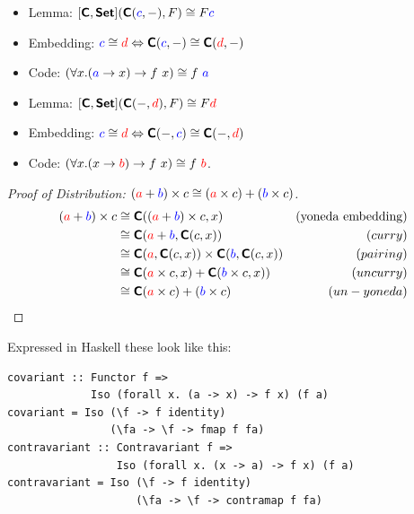 \documentclass[tikz]{beamer}
\newcommand{\cat}[1]{\bm{ \mathsf{#1} }}
\newcommand{\cc}{\cat{C}}
\newcommand{\red}[1]{\textcolor{red}{#1}}
\newcommand{\blue}[1]{\textcolor{blue}{#1}}
\theoremstyle{definition}
\begin{document}
\frame
{
	\begin{definition}
		\begin{itemize}
			\item Lemma: $[\cc, \cat{Set}](\cc(\blue{c}, -), F) \cong F\blue{c}$
			\item Embedding: $\blue{c} \cong \red{d} \Leftrightarrow \cc(\blue{c}, -) \cong \cc(\red{d}, -)$
			\item Code: $ (\forall x. (\blue{a} \to x) \to f~x) \cong f~\blue{a}$
		\end{itemize}
	\end{definition}
}

\frame
{
	\begin{definition}
		\begin{itemize}
			\item Lemma: $[\cc, \cat{Set}](\cc(-, \red{d}), F) \cong F\red{d}$
			\item Embedding: $\blue{c} \cong \red{d} \Leftrightarrow \cc(-, \blue{c}) \cong \cc(-, \red{d})$
			\item Code: $(\forall x. (x \to \red{b}) \to f~x) \cong f~\red{b}$. 
		\end{itemize}
	\end{definition}
}

\frame
{
	\begin{proof}[Proof of Distribution: $(\red{a} + \blue{b}) \times c \cong (\red{a} \times c) + (\blue{b} \times c)$]
		\[
		\begin{aligned}
			(\red{a} + \blue{b}) \times c &\cong \cc((\red{a} + \blue{b}) \times c, x) &(\text{yoneda embedding}) \\
			& \cong \cc(\red{a}  + \blue{b}, \cc(c, x)) &(curry) \\
			& \cong \cc(\red{a} , \cc(c, x)) \times \cc(\blue{b}, \cc(c, x)) &(pairing) \\
			& \cong \cc(\red{a}  \times c, x) + \cc(\blue{b} \times c, x)) &(uncurry) \\
			& \cong \cc(\red{a}  \times c) + (\blue{b} \times c) &(un-yoneda)
		\end{aligned}
		\]
	\end{proof}
}


\begin{frame}[fragile]
Expressed in Haskell these look like this:
\begin{verbatim}
covariant :: Functor f =>
             Iso (forall x. (a -> x) -> f x) (f a)
covariant = Iso (\f -> f identity)
                (\fa -> \f -> fmap f fa)
contravariant :: Contravariant f =>
                 Iso (forall x. (x -> a) -> f x) (f a)
contravariant = Iso (\f -> f identity)
                    (\fa -> \f -> contramap f fa)
\end{verbatim}
\end{frame}
\end{document}
